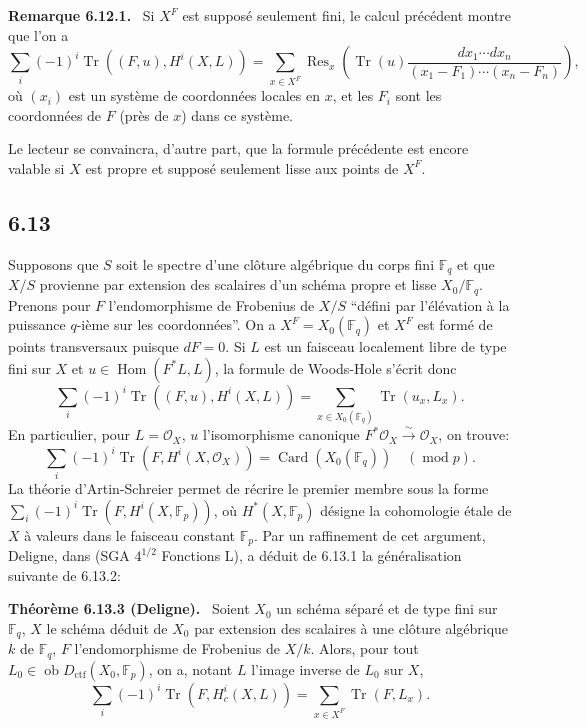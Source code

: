\documentclass[11pt]{article}
\newenvironment{statement}[1]{\par\medskip\noindent\textbf{#1.}\ }{\par\medskip}
\DeclareMathOperator{\Hom}{Hom}
\newcommand{\ob}{\operatorname{ob}}
\providecommand{\ctf}{\mathrm{ctf}}
\providecommand{\OO}{\mathcal{O}}
\providecommand{\Hom}{\operatorname{Hom}}
\providecommand{\ob}{\operatorname{ob}}
\providecommand{\Hom}{\operatorname{Hom}}
\begin{document}
\begin{statement}{Remarque 6.12.1}
Si $X^F$ est supposé seulement fini, le calcul précédent montre que l'on a
\[
\sum_i(-1)^i\operatorname{Tr}((F,u),H^i(X,L))=
\sum_{x\in X^F}\operatorname{Res}_x\left(\operatorname{Tr}(u)\frac{dx_1\cdots dx_n}{(x_1-F_1)\cdots(x_n-F_n)}\right),
\]
où $(x_i)$ est un système de coordonnées locales en $x$, et les $F_i$ sont les coordonnées de $F$ (près de $x$) dans ce système.

Le lecteur se convaincra, d'autre part, que la formule précédente est encore valable si $X$ est propre et supposé seulement lisse aux points de $X^F$.
\end{statement}

\subsection*{6.13}
Supposons que $S$ soit le spectre d'une clôture algébrique du corps fini $\mathbb F_q$ et que $X/S$ provienne par extension des scalaires d'un schéma propre et lisse $X_0/\mathbb F_q$. Prenons pour $F$ l'endomorphisme de Frobenius de $X/S$ ``défini par l'élévation à la puissance $q$-ième sur les coordonnées''. On a $X^F=X_0(\mathbb F_q)$ et $X^F$ est formé de points transversaux puisque $dF=0$. Si $L$ est un faisceau localement libre de type fini sur $X$ et $u\in\Hom(F^*L,L)$, la formule de Woods-Hole s'écrit donc
\begin{equation}
\tag{6.13.1}
\sum_i(-1)^i\operatorname{Tr}((F,u),H^i(X,L))=
\sum_{x\in X_0(\mathbb F_q)}\operatorname{Tr}(u_x,L_x).
\end{equation}
En particulier, pour $L=\OO_X$, $u$ l'isomorphisme canonique $F^*\OO_X\xrightarrow{\sim}\OO_X$, on trouve:
\begin{equation}
\tag{6.13.2}
\sum_i(-1)^i\operatorname{Tr}(F,H^i(X,\OO_X))=\operatorname{Card}(X_0(\mathbb F_q))\quad(\operatorname{mod} p).
\end{equation}
La théorie d'Artin-Schreier permet de récrire le premier membre sous la forme $\sum_i(-1)^i\operatorname{Tr}(F,H^i(X,\mathbb F_p))$, où $H^*(X,\mathbb F_p)$ désigne la cohomologie étale de $X$ à valeurs dans le faisceau constant $\mathbb F_p$. Par un raffinement de cet argument, Deligne, dans (SGA $4^{1/2}$ Fonctions L), a déduit de 6.13.1 la généralisation suivante de 6.13.2:


\begin{statement}{Théorème 6.13.3 (Deligne)}
Soient $X_0$ un schéma séparé et de type fini sur $\mathbb F_q$, $X$ le schéma déduit de $X_0$ par extension des scalaires à une clôture algébrique $k$ de $\mathbb F_q$, $F$ l'endomorphisme de Frobenius de $X/k$. Alors, pour tout $L_0\in\ob D_{\ctf}(X_0,\mathbb F_p)$, on a, notant $L$ l'image inverse de $L_0$ sur $X$,
\[
\sum_i(-1)^i\operatorname{Tr}(F,H_c^i(X,L))=
\sum_{x\in X^F}\operatorname{Tr}(F,L_x).
\]
\end{statement}
\end{document}
